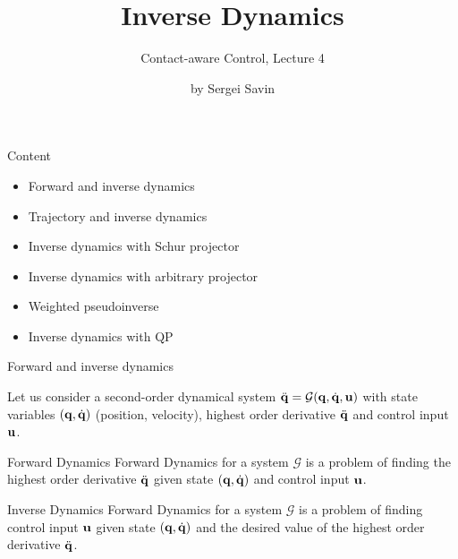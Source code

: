\documentclass{beamer}
\title{Inverse Dynamics}
\subtitle{Contact-aware Control, Lecture 4}
\author{by Sergei Savin}
\date{\mydate}
\begin{document}
\maketitle


\begin{frame}{Content}

\begin{itemize}
\item Forward and inverse dynamics
\item Trajectory and inverse dynamics
\item Inverse dynamics with Schur projector
\item Inverse dynamics with arbitrary projector
\item Weighted pseudoinverse
\item Inverse dynamics with QP
\end{itemize}

\end{frame}




\begin{frame}{Forward and inverse dynamics}
	\begin{flushleft}
		
		Let us consider a second-order dynamical system $\ddot{\mathbf{q}} = \mathcal{G}(\mathbf{q}, \dot{\mathbf{q}}, \mathbf{u})$ with state variables $(\mathbf{q}, \dot{\mathbf{q}})$ (position, velocity), highest order derivative $\ddot{\mathbf{q}}$ and control input $\mathbf{u}$.
		
		\bigskip
		
		\begin{block}{Forward Dynamics}
			Forward Dynamics for a system $\mathcal{G}$ is a problem of finding the highest order derivative $\ddot{\mathbf{q}}$ given state $(\mathbf{q}, \dot{\mathbf{q}})$ and control input $\mathbf{u}$.
		\end{block} 
		
		\bigskip
		
		\begin{block}{Inverse Dynamics}
			Forward Dynamics for a system $\mathcal{G}$ is a problem of finding control input $\mathbf{u}$ given state $(\mathbf{q}, \dot{\mathbf{q}})$ and the desired value of the highest order derivative $\ddot{\mathbf{q}}$.
		\end{block} 
	
	\end{flushleft}
\end{frame}
\end{document}
